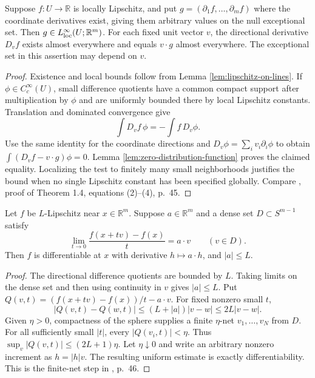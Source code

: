 \begin{lemma}\label{lem:directional-weak-linearity}
Suppose $f:U\to\mathbb R$ is locally Lipschitz, and put $g=(\partial_1f,\ldots,\partial_mf)$ where the coordinate derivatives exist, giving them arbitrary values on the null exceptional set. Then $g\in L^\infty_{\rm loc}(U;\mathbb R^m)$. For each fixed unit vector $v$, the directional derivative $D_vf$ exists almost everywhere and equals $v\cdot g$ almost everywhere. The exceptional set in this assertion may depend on $v$.
\end{lemma}
\begin{proof}
Existence and local bounds follow from Lemma \ref{lem:lipschitz-on-lines}. If $\phi\in C_c^\infty(U)$, small difference quotients have a common compact support after multiplication by $\phi$ and are uniformly bounded there by local Lipschitz constants. Translation and dominated convergence give
\[
 \int D_vf\,\phi=-\int f\,D_v\phi.
\]
Use the same identity for the coordinate directions and $D_v\phi=\sum_iv_i\partial_i\phi$ to obtain $\int(D_vf-v\cdot g)\phi=0$. Lemma \ref{lem:zero-distribution-function} proves the claimed equality. Localizing the test to finitely many small neighborhoods justifies the bound when no single Lipschitz constant has been specified globally. Compare \cite{Sim18}, proof of Theorem 1.4, equations (2)--(4), p.~45.
\end{proof}

\begin{lemma}\label{lem:angular-net-differentiability}
Let $f$ be $L$-Lipschitz near $x\in\mathbb R^m$. Suppose $a\in\mathbb R^m$ and a dense set $D\subset S^{m-1}$ satisfy
\[
 \lim_{t\to0}\frac{f(x+tv)-f(x)}t=a\cdot v\qquad(v\in D).
\]
Then $f$ is differentiable at $x$ with derivative $h\mapsto a\cdot h$, and $|a|\leq L$.
\end{lemma}
\begin{proof}
The directional difference quotients are bounded by $L$. Taking limits on the dense set and then using continuity in $v$ gives $|a|\leq L$. Put $Q(v,t)=(f(x+tv)-f(x))/t-a\cdot v$. For fixed nonzero small $t$,
\[
 |Q(v,t)-Q(w,t)|\leq(L+|a|)|v-w|\leq2L|v-w|.
\]
Given $\eta>0$, compactness of the sphere supplies a finite $\eta$-net $v_1,\ldots,v_N$ from $D$. For all sufficiently small $|t|$, every $|Q(v_i,t)|<\eta$. Thus $\sup_v|Q(v,t)|\leq(2L+1)\eta$. Let $\eta\downarrow0$ and write an arbitrary nonzero increment as $h=|h|v$. The resulting uniform estimate is exactly differentiability. This is the finite-net step in \cite{Sim18}, p.~46.
\end{proof}

